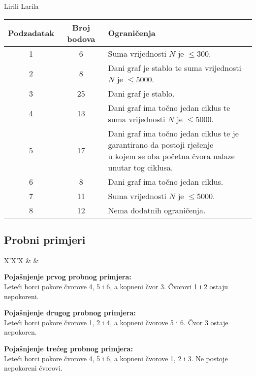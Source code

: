 \begin{statement}[
  problempoints=100,
  timelimit=3 sekunde,
  memorylimit=512 MiB,
]{Lirili Larila}
{\renewcommand{\arraystretch}{1.4}
  \setlength{\tabcolsep}{6pt}
  \begin{tabular}{ccl}
   Podzadatak & Broj bodova & Ograničenja \\ \midrule
    1 & 6 & Suma vrijednosti $N$ je $\leq 300$. \\
    2 & 8 & Dani graf je stablo te suma vrijednosti $N$ je $\leq 5000$. \\
    3 & 25 & Dani graf je stablo. \\
    4 & 13 & Dani graf ima točno jedan ciklus te suma vrijednosti $N$ je $\leq 5000$. \\[5pt]
    5 & 17 & \makecell[l]{Dani graf ima točno jedan ciklus te je garantirano da postoji rješenje \\ u kojem se oba početna čvora nalaze unutar tog ciklusa.}  \\[6pt]
    6 & 8 & Dani graf ima točno jedan ciklus. \\
    7 & 11 & Suma vrijednosti $N$ je $\leq 5000$. \\
    8 & 12 & Nema dodatnih ograničenja. \\
\end{tabular}}

\subsection*{Probni primjeri}
\begin{tabularx}{\textwidth}{X'X'X}
 &
 &
\end{tabularx}

\textbf{Pojašnjenje prvog probnog primjera:} \\
Leteći borci pokore čvorove 4, 5 i 6, a kopneni čvor 3. Čvorovi 1 i 2 ostaju nepokoreni. 

\textbf{Pojašnjenje drugog probnog primjera:} \\
Leteći borci pokore čvorove 1, 2 i 4, a kopneni čvorove 5 i 6. Čvor 3 ostaje nepokoren. 

\textbf{Pojašnjenje trećeg probnog primjera:} \\
Leteći borci pokore čvorove 4, 5 i 6, a kopneni čvorove 1, 2 i 3. Ne postoje nepokoreni čvorovi. 

\end{statement}

